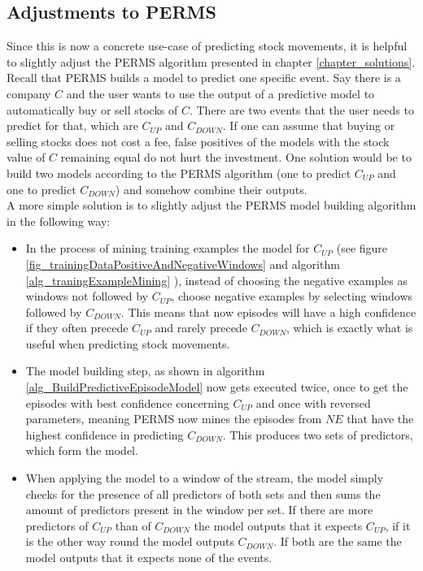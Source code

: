 \subsection{Adjustments to PERMS}
Since this is now a concrete use-case of predicting stock movements, it is helpful to slightly adjust the PERMS algorithm presented in chapter \ref{chapter_solutions}. Recall that PERMS builds a model to predict one specific event. Say there is a company $C$ and the user wants to use the output of a predictive model to automatically buy or sell stocks of $C$. There are two events that the user needs to predict for that, which are $C_{UP}$ and $C_{DOWN}$. If one can assume that buying or selling stocks does not cost a fee, false positives of the models with the stock value of $C$ remaining equal do not hurt the investment. One solution would be to build two models according to the PERMS algorithm (one to predict $C_{UP}$ and one to predict $C_{DOWN}$) and somehow combine their outputs. \\ A more simple solution is to slightly adjust the PERMS model building algorithm in the following way:

\begin{itemize}
	\item In the process of mining training examples the model for $C_{UP}$ (see figure \ref{fig_trainingDataPositiveAndNegativeWindows} and algorithm \ref{alg_traningExampleMining} ), instead of choosing the negative examples as windows not followed by $C_{UP}$, choose negative examples by selecting windows followed by $C_{DOWN}$. This means that now episodes will have a high confidence if they often precede $C_{UP}$ and rarely precede $C_{DOWN}$, which is exactly what is useful when predicting stock movements.
	\item The model building step, as shown in algorithm \ref{alg_BuildPredictiveEpisodeModel} now gets executed twice, once to get the episodes with best confidence concerning $C_{UP}$ and once with reversed parameters, meaning PERMS now mines the episodes from $NE$ that have the highest confidence in predicting $C_{DOWN}$. This produces two sets of predictors, which form the model.
	\item When applying the model to a window of the stream, the model simply checks for the presence of all predictors of both sets and then sums the amount of predictors present in the window per set. If there are more predictors of $C_{UP}$ than of $C_{DOWN}$ the model outputs that it expects $C_{UP}$, if it is the other way round the model outputs $C_{DOWN}$. If both are the same the model outputs that it expects none of the events.
\end{itemize}


